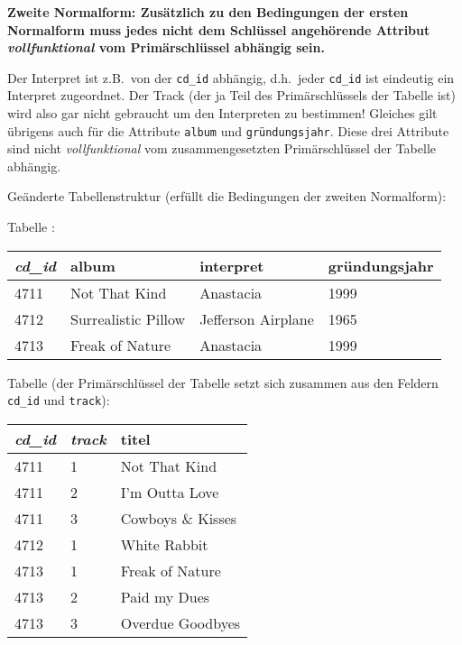 \textbf{Zweite Normalform: Zusätzlich zu den Bedingungen der ersten Normalform
muss jedes nicht dem Schlüssel angehörende Attribut \emph{vollfunktional} vom
Primärschlüssel abhängig sein.}

Der Interpret ist z.B.\ von der \lstinline|cd_id| abhängig, d.h.\ jeder
\lstinline|cd_id| ist eindeutig ein Interpret zugeordnet. Der Track (der ja
Teil des Primärschlüssels der Tabelle ist) wird also gar nicht gebraucht um den
Interpreten zu bestimmen! Gleiches gilt übrigens auch für die Attribute
\lstinline|album| und \lstinline|gründungsjahr|. Diese drei Attribute sind nicht
\emph{vollfunktional} vom zusammengesetzten Primärschlüssel der Tabelle
abhängig.

Geänderte Tabellenstruktur (erfüllt die Bedingungen der zweiten Normalform):

Tabelle :

\vspace{1mm}

\begin{tabular}{|l|l|l|l|}\hline
\textbf{\em cd\_id} & \textbf{album} & \textbf{interpret} &
\textbf{gründungsjahr}\\ \hline 
4711 & Not That Kind & Anastacia & 1999\\ \hline
4712 & Surrealistic Pillow & Jefferson Airplane & 1965\\ \hline
4713 & Freak of Nature & Anastacia & 1999\\ \hline
\end{tabular}

\vspace{2mm}

Tabelle  (der Primärschlüssel der Tabelle setzt
sich zusammen aus den Feldern \lstinline|cd_id| und \lstinline|track|):

\vspace{1mm}

\begin{tabular}{|l|l|l|}\hline
\textbf{\em cd\_id} & \textbf{\em track} & \textbf{titel}\\ \hline
4711 & 1 & Not That Kind\\ \hline
4711 & 2 & I'm Outta Love\\ \hline
4711 & 3 & Cowboys \& Kisses\\ \hline
4712 & 1 & White Rabbit\\ \hline
4713 & 1 & Freak of Nature\\ \hline
4713 & 2 & Paid my Dues\\ \hline
4713 & 3 & Overdue Goodbyes\\ \hline
\end{tabular}

